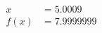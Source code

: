\documentclass[preview]{standalone}
\begin{document}
\begin{align*}
x &= 5.0009\\f(x) &= 7.9999999
\end{align*}
\end{document}
